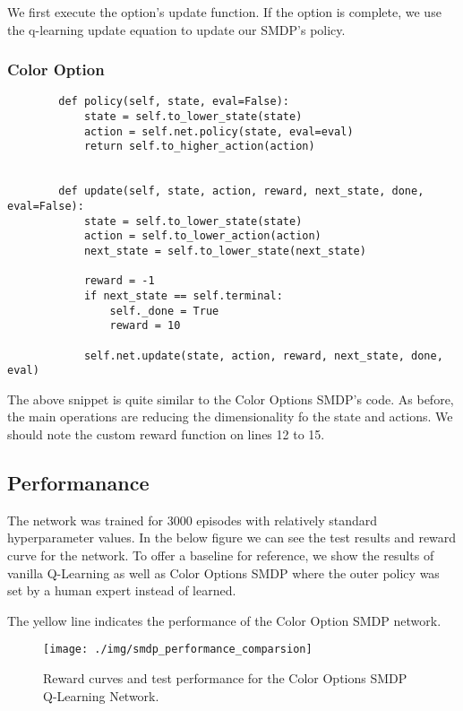 \documentclass[A4]{article}
\begin{document}
    We first execute the option's update function.
    If the option is complete, we use the q-learning update equation to update our SMDP's policy.

    \subsubsection{Color Option}
    \begin{verbatim}
        def policy(self, state, eval=False):
            state = self.to_lower_state(state)
            action = self.net.policy(state, eval=eval)
            return self.to_higher_action(action)


        def update(self, state, action, reward, next_state, done, eval=False):
            state = self.to_lower_state(state)
            action = self.to_lower_action(action)
            next_state = self.to_lower_state(next_state)

            reward = -1
            if next_state == self.terminal:
                self._done = True
                reward = 10

            self.net.update(state, action, reward, next_state, done, eval)
    \end{verbatim}

    The above snippet is quite similar to the Color Options SMDP's code.
    As before, the main operations are reducing the dimensionality fo the state and actions.
    We should note the custom reward function on lines 12 to 15.

    \subsection{Performanance}
    The network was trained for 3000 episodes with relatively standard hyperparameter values.
    In the below figure we can see the test results and reward curve for the network.
    To offer a baseline for reference, we show the results of vanilla Q-Learning
    as well as Color Options SMDP where the outer policy was set by a human expert instead of learned.

    The yellow line indicates the performance of the Color Option SMDP network.

    \begin{figure}[H]
        \centering
        \texttt{[image: ./img/smdp\_performance\_comparsion]}
        \caption{Reward curves and test performance for the Color Options SMDP Q-Learning Network.}
    \end{figure}
\end{document}
